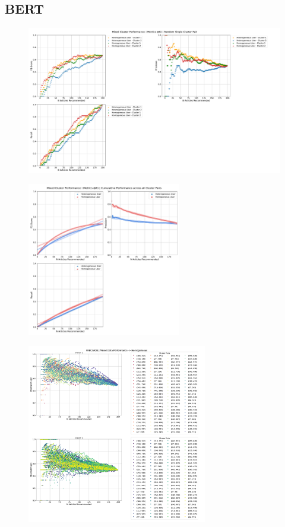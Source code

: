 \documentclass[a4paper,fontsize=8.0pt]{scrartcl}
\begin{document}
\subsection{BERT}
\begin{figure}[H]
    \includegraphics[width=1.0\textwidth]{Graphs/BERT/user_interaction_vs_model_performance_mixed_cluster.pdf}
\end{figure}
\begin{figure}[H]
 \includegraphics[width=0.6\textwidth]{Graphs/BERT/user_interaction_vs_model_performance_cumu_mixed_cluster.pdf}
\end{figure}
\begin{figure}[H]
 \includegraphics[width=0.7\textwidth]{Graphs/BERT/user_interaction_vs_model_performance_precision_all_cps_mixed_data_sep_Homogeneous.pdf}
\end{figure}
\end{document}
